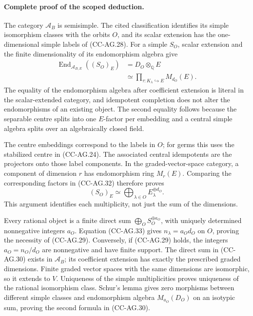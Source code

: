 \paragraph{Complete proof of the scoped deduction.}
The category \(\mathcal A_B\) is semisimple.  The cited
classification identifies its simple isomorphism classes
with the orbits \(O\), and its scalar extension has the
one-dimensional simple labels of (CC-AG.28).
For a simple \(S_O\), scalar extension and the finite
dimensionality of its endomorphism algebra give
\[
 \begin{split}
 \operatorname{End}_{\mathcal A_{B,E}}((S_O)_E)
       &=D_O\otimes_{\mathbb Q}E\\
       &\simeq\prod_{\tau:K_\lambda\hookrightarrow E}M_{d_O}(E).
 \end{split}                                                \tag{CC-AG.32}
\]
The equality of the endomorphism algebra after coefficient
extension is literal in the scalar-extended category, and
idempotent completion does not alter the endomorphisms of
an existing object.  The second equality follows because
the separable centre splits into one \(E\)-factor per
embedding and a central simple algebra splits over an
algebraically closed field.

The centre embeddings correspond to the labels in \(O\);
for germs this uses the stabilized centre in (CC-AG.24).
The associated central idempotents are the projectors onto
those label components.  In the graded-vector-space
category, a component of dimension \(r\) has endomorphism
ring \(M_r(E)\).  Comparing the corresponding factors in
(CC-AG.32) therefore proves
\[
               (S_O)_E
                  \simeq\bigoplus_{\lambda\in O}
                                E_\lambda^{\oplus d_O}.      \tag{CC-AG.33}
\]
This argument identifies each multiplicity, not just the
sum of the dimensions.

Every rational object is a finite direct sum
\(\bigoplus_O S_O^{\oplus a_O}\), with uniquely determined
nonnegative integers \(a_O\).  Equation (CC-AG.33) gives
\(n_\lambda=a_Od_O\) on \(O\), proving the necessity of
(CC-AG.29).  Conversely, if (CC-AG.29) holds, the integers
\(a_O=n_O/d_O\) are nonnegative and have finite support.
The direct sum in (CC-AG.30) exists in \(\mathcal A_B\);
its coefficient extension has exactly the prescribed
graded dimensions.  Finite graded vector spaces with the
same dimensions are isomorphic, so it extends to \(V\).
Uniqueness of the simple multiplicities proves uniqueness
of the rational isomorphism class.  Schur's lemma gives
zero morphisms between different simple classes and
endomorphism algebra \(M_{a_O}(D_O)\) on an isotypic sum,
proving the second formula in (CC-AG.30).

